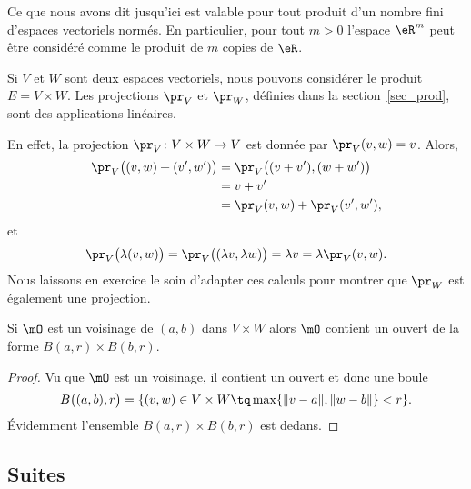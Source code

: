 Ce que nous avons dit jusqu'ici est valable pour tout produit d'un nombre fini d'espaces vectoriels normés. En particulier, pour tout $m>0$  l'espace  $\eR^m$ peut être considéré comme le produit de $m$ copies de $\eR$.

\begin{example}
	Si $V$ et $W$ sont deux espaces vectoriels, nous pouvons considérer le produit $E=V\times W$. Les projections $\pr_V$ et $\pr_W$, définies dans la section~\ref{sec_prod}, sont des applications linéaires.

	En effet, la projection $\pr_V\colon V\times W\to V$ est donnée par $\pr_V(v,w)=v$. Alors,
	\begin{equation}
		\begin{aligned}[]
			\pr_V\big( (v,w)+(v',w') \big)&=\pr_V\big( (v+v'),(w+w') \big)\\
			&=v+v'\\
			&=\pr_V(v,w)+\pr_V(v',w'),
		\end{aligned}
	\end{equation}
	et
	\begin{equation}
		\pr_V\big( \lambda(v,w) \big)=\pr_V\big( (\lambda v,\lambda w) \big)=\lambda v=\lambda\pr_V(v,w).
	\end{equation}
	Nous laissons en exercice le soin d'adapter ces calculs pour montrer que $\pr_W$ est également une projection.
\end{example}

\begin{proposition} \label{PropDXR_KbaLC}
    Si \( \mO\) est un voisinage de \( (a,b)\) dans \( V\times W\) alors \( \mO\) contient un ouvert de la forme \( B(a,r)\times B(b,r)\).
\end{proposition}

\begin{proof}
    Vu que \( \mO\) est un voisinage, il contient un ouvert et donc une boule
    \begin{equation}
        B\big( (a,b),r \big)=\{ (v,w)\in V\times W\tq \max\{ \| v-a \|,\| w-b \| \}< r \}.
    \end{equation}
    Évidemment l'ensemble \( B(a,r)\times B(b,r)\) est dedans.
\end{proof}

\subsection{Suites}

